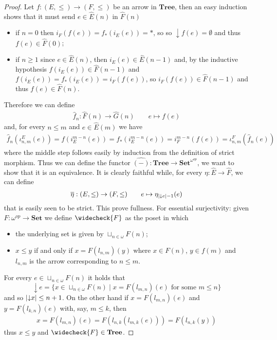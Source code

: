 \documentclass[runningheads,envcountsect]{lmcs}
\newcommand{\catname}[1]{\mathbf{#1}}
\newcommand{\pred}[1]{{\downarrow}#1}
\newcommand{\tree}{\catname{Tree}}
\theoremstyle{plain}
\theoremstyle{definition}
\begin{document}
\begin{proof}
		Let $f:(E, \leq)\rightarrow (F,\leq)$ be an arrow in $\tree$, then an easy induction shows that it must send $e\in \widehat{E}(n)$ in $\widehat{F}(n)$
		\begin{itemize}
			\item if $n=0$ then $		i_{F}(f(e))=f_*(i_E(e))=*$, so
			so $\pred{f(e)}=\emptyset$ and thus $f(e)\in \widehat{F}(0)$;
			\item if $n\geq 1$ since $e\in \widehat{E}(n)$, then $i_E(e)\in \widehat{E}(n-1)$ and, by the inductive hypothesis $f(i_E(e))\in \widehat{F}(n-1)$ and $		f(i_E(e))=f_*(i_E(e))=i_F(f(e))$,
			so $i_F(f(e))\in \widehat{F}(n-1)$ and thus $f(e)\in \widehat{F}(n)$.
		\end{itemize}
		Therefore we can define 
		\begin{align*}
			\widehat{f}_{n}:\widehat{F}(n)\rightarrow \widehat{G}(n)\qquad
			e\mapsto f(e)
		\end{align*}
		and, for every $n\leq m$ and $e\in \widehat{E}(m)$ we have
		\begin{align*} 
			\widehat{f}_n({\iota^E_{n,m}}(e))=f(i^{m-n}_E(e))=f_*(i^{m-n}_E(e))=i^{m-n}_F(f(e))=\iota^F_{n,m}(\widehat{f}_n(e))
		\end{align*}
		where the middle step follows easily by induction from the definition of strict morphism. Thus we can define the functor $\widehat{(-)}:\tree \rightarrow \catname{Set}^{\omega^{op}}$, we want to show that it is an equivalence. It is clearly faithful while, for every $\eta:\widehat{E}\rightarrow \widehat{F}$, we can define
		\begin{align*}
			\overline{\eta}:(E, \leq ) \rightarrow (F, \leq )\qquad 
			e \mapsto \eta_{\abs{\pred{e}}-1}(e)
		\end{align*}
		that is easily seen to be strict. This prove fullness. For essential surjectivity: given $F:\omega^{op}\rightarrow \catname{Set}$ we define  $\widecheck{F}$ as the poset in which
		\begin{itemize}
			\item the underlying set is given by $\sqcup_{n\in \omega}F(n)$;
			\item  $x\leq y$ if and only if $x=F(l_{n,m})(y)$ where $x\in F(n)$, $y\in f(m)$ and $l_{n,m}$ is the arrow corresponding to $n\leq m$.
		\end{itemize} 
		For every $e\in \sqcup_{n\in \omega}F(n) $ it holds that
		\begin{equation*}
			\pred{e}=\{x\in \sqcup_{n\in \omega}F(n)\mid x= F(l_{m,n})(e) \text{ for some } m \leq n \}
		\end{equation*}
		and so $\abs{\pred{x}}\leq n+1$. On the other hand if $x=F(l_{m,n})(e)$ and $y=F(l_{k,n})(e)$ with, say, $m\leq k$, then
		\begin{align*}
			x=F(l_{m,n})(e)=F(l_{n,k}(l_{m,k}(e)))=F(l_{n,k}(y))
		\end{align*}
		thus $x\leq y$ and $\widecheck{F}\in \tree$.
\end{proof}
\end{document}
